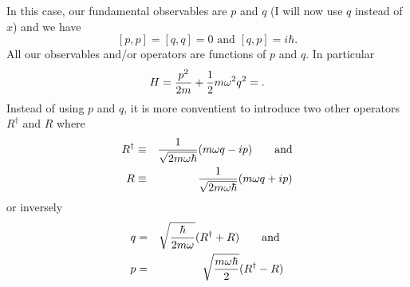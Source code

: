 In this case, our fundamental observables are $p$ and $q$ (I will now use $q$ instead of $x$) and we have
$$\left[ p,p\right] = \left[q,q\right] = 0\mbox{   and  } \left[q,p\right] = i\hbar.$$
All our observables and/or operators are functions of $p$ and $q$. In particular
$$H = {p^2\over2m} + {1\over2} m\omega^2 q^2 = .$$
Instead of using $p$ and $q$, it is more conventient to introduce two other operators $R^\dagger$ and $R$ where 
\begin{eqnarray*}
R^\dagger &\equiv& {1\over\sqrt{2m\omega\hbar}}(m\omega q - ip)\mbox{~~~~~        and} \\
R               &\equiv& {1\over\sqrt{2m\omega\hbar}}(m\omega q + ip)
\end{eqnarray*}
or inversely
\begin{eqnarray*}
q &=& \sqrt{\hbar\over2m\omega} (R^\dagger + R)\mbox{~~~~~         and } \\
p &=& \sqrt{m\omega\hbar\over2} (R^\dagger  - R)
\end{eqnarray*}









